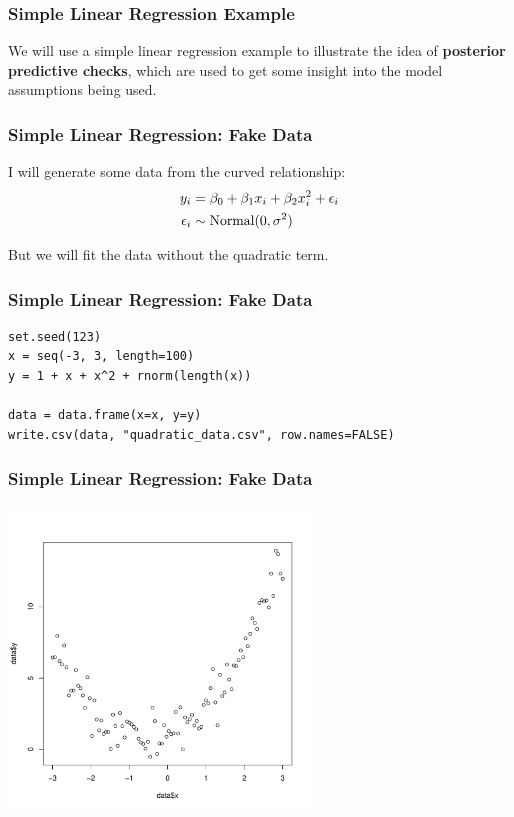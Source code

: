 \documentclass{beamer}
\begin{document}
\begin{frame}
\frametitle{Simple Linear Regression Example}
We will use a simple linear regression example to illustrate the idea
of {\bf posterior predictive checks}, which are used to get some insight into
the model assumptions being used.

\end{frame}


\begin{frame}
\frametitle{Simple Linear Regression: Fake Data}
I will generate some data from the curved relationship:
\begin{align}
y_i &= \beta_0 + \beta_1 x_i + \beta_2 x_i^2 + \epsilon_i\\
\epsilon_i &\sim \textnormal{Normal}(0, \sigma^2)
\end{align}

\pause

But we will fit the data without the quadratic term.


\end{frame}

\begin{frame}[fragile]
\frametitle{Simple Linear Regression: Fake Data}
\begin{verbatim}
set.seed(123)
x = seq(-3, 3, length=100)
y = 1 + x + x^2 + rnorm(length(x))

data = data.frame(x=x, y=y)
write.csv(data, "quadratic_data.csv", row.names=FALSE)
\end{verbatim}

\end{frame}


\begin{frame}
\frametitle{Simple Linear Regression: Fake Data}

\begin{center}
\includegraphics[width=0.6\textwidth]{images/quadratic_data.pdf}
\end{center}

\end{frame}
\end{document}
